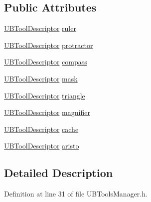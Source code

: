 \subsection*{Public Attributes}
\begin{DoxyCompactItemize}
\item 
\hyperlink{class_u_b_tools_manager_1_1_u_b_tool_descriptor}{U\-B\-Tool\-Descriptor} \hyperlink{class_u_b_tools_manager_aec086ff9cf2c9f7ad222c78dd8fab233}{ruler}
\item 
\hyperlink{class_u_b_tools_manager_1_1_u_b_tool_descriptor}{U\-B\-Tool\-Descriptor} \hyperlink{class_u_b_tools_manager_ae9a0724a4de13dca8a73ba67e60e2890}{protractor}
\item 
\hyperlink{class_u_b_tools_manager_1_1_u_b_tool_descriptor}{U\-B\-Tool\-Descriptor} \hyperlink{class_u_b_tools_manager_a14bfc0697940f6967dfc5c570d27a7f9}{compass}
\item 
\hyperlink{class_u_b_tools_manager_1_1_u_b_tool_descriptor}{U\-B\-Tool\-Descriptor} \hyperlink{class_u_b_tools_manager_aff695a60e371066eb8d00b005bc97dd5}{mask}
\item 
\hyperlink{class_u_b_tools_manager_1_1_u_b_tool_descriptor}{U\-B\-Tool\-Descriptor} \hyperlink{class_u_b_tools_manager_a44210809a60383e4a9f42f5c2c89ce6c}{triangle}
\item 
\hyperlink{class_u_b_tools_manager_1_1_u_b_tool_descriptor}{U\-B\-Tool\-Descriptor} \hyperlink{class_u_b_tools_manager_a471df7ab9140cfa9132d305556a7d7fb}{magnifier}
\item 
\hyperlink{class_u_b_tools_manager_1_1_u_b_tool_descriptor}{U\-B\-Tool\-Descriptor} \hyperlink{class_u_b_tools_manager_aec03d681b2a516439d3fd53835633cb8}{cache}
\item 
\hyperlink{class_u_b_tools_manager_1_1_u_b_tool_descriptor}{U\-B\-Tool\-Descriptor} \hyperlink{class_u_b_tools_manager_a8032199deee15348df96fe28ac9aa06e}{aristo}
\end{DoxyCompactItemize}


\subsection{Detailed Description}


Definition at line 31 of file U\-B\-Tools\-Manager.\-h.



